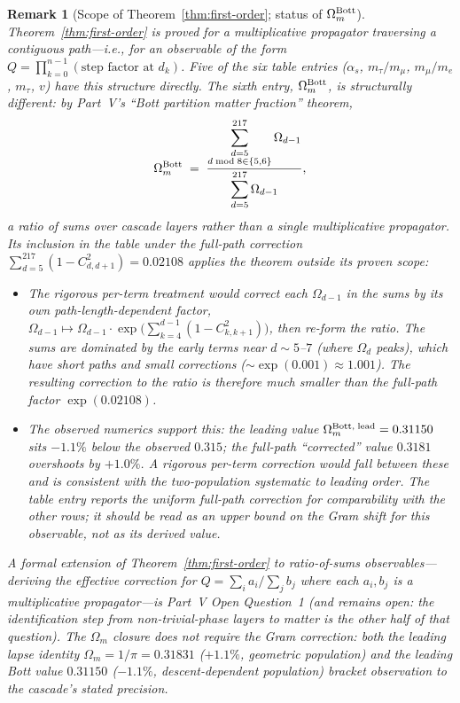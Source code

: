 \documentclass[11pt,a4paper]{article}
\newtheorem{remark}[theorem]{Remark}
\begin{document}
\begin{remark}[Scope of Theorem~\ref{thm:first-order}; status of $\Omega_m^{\rm Bott}$]\label{rem:sp9-status}
Theorem~\ref{thm:first-order} is proved for a \emph{multiplicative
propagator} traversing a contiguous path---i.e., for an observable of
the form $Q = \prod_{k=0}^{n-1}(\text{step factor at }d_k)$. Five of the
six table entries ($\alpha_s$, $m_\tau/m_\mu$, $m_\mu/m_e$, $m_\tau$,
$v$) have this structure directly. The sixth entry,
$\Omega_m^{\rm Bott}$, is structurally different: by
Part~V's ``Bott partition matter fraction'' theorem,
\[
\Omega_m^{\rm Bott}
\;=\;
\frac
{\displaystyle\sum_{\substack{d=5\\ d\bmod 8\in\{5,6\}}}^{217}\Omega_{d-1}}
{\displaystyle\sum_{d=5}^{217}\Omega_{d-1}},
\]
a \emph{ratio of sums} over cascade layers rather than a single
multiplicative propagator. Its inclusion in the table under the
full-path correction $\sum_{d=5}^{217}(1-C^2_{d,d+1}) = 0.02108$
applies the theorem outside its proven scope:
\begin{itemize}
\item The rigorous per-term treatment would correct each
$\Omega_{d-1}$ in the sums by its own path-length-dependent factor,
$\Omega_{d-1}\mapsto\Omega_{d-1}\cdot
\exp\bigl(\sum_{k=4}^{d-1}(1-C^2_{k,k+1})\bigr)$, then re-form the
ratio. The sums are dominated by the early terms near $d\sim 5$--$7$
(where $\Omega_d$ peaks), which have short paths and small corrections
($\sim\exp(0.001)\approx 1.001$). The resulting correction to the
ratio is therefore much smaller than the full-path factor
$\exp(0.02108)$.
\item The observed numerics support this: the leading value
$\Omega_m^{\rm Bott,\;lead}=0.31150$ sits $-1.1\%$ below the
observed $0.315$; the full-path ``corrected'' value $0.3181$
overshoots by $+1.0\%$. A rigorous per-term correction would fall
between these and is consistent with the two-population systematic
to leading order. The table entry reports the uniform full-path
correction for comparability with the other rows; it should be read
as an upper bound on the Gram shift for this observable, not as its
derived value.
\end{itemize}
A formal extension of Theorem~\ref{thm:first-order} to ratio-of-sums
observables---deriving the effective correction for
$Q=\sum_i a_i/\sum_j b_j$ where each $a_i,b_j$ is a multiplicative
propagator---is Part~V Open Question~1 (and remains open: the
identification step from non-trivial-phase layers to matter is the
other half of that question). The $\Omega_m$ closure does not
\emph{require} the Gram correction: both the leading lapse identity
$\Omega_m=1/\pi=0.31831$ ($+1.1\%$, geometric population) and the
leading Bott value $0.31150$ ($-1.1\%$, descent-dependent population)
bracket observation to the cascade's stated precision.
\end{remark}
\end{document}
